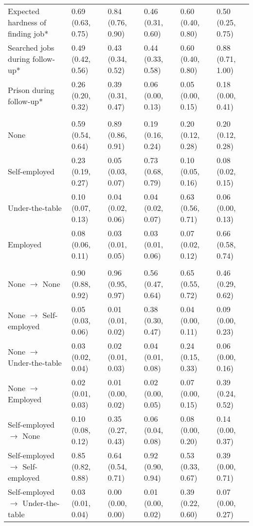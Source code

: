 \begin{table}[htp]
\begin{threeparttable}
\begin{tabular}{llllll}
  \quad Expected hardness of finding job* & 0.69 (0.63, 0.75) & 0.84 (0.76, 0.90) & 0.46 (0.31, 0.60) & 0.60 (0.40, 0.80) & 0.50 (0.25, 0.75) \\ 
  \quad Searched jobs during follow-up* & 0.49 (0.42, 0.56) & 0.43 (0.34, 0.52) & 0.44 (0.33, 0.58) & 0.60 (0.40, 0.80) & 0.88 (0.71, 1.00) \\ 
  \quad Prison during follow-up* & 0.26 (0.20, 0.32) & 0.39 (0.31, 0.47) & 0.06 (0.00, 0.13) & 0.05 (0.00, 0.15) & 0.18 (0.00, 0.41) \\ 
  \addlinespace[12pt]
\multicolumn{6}{l}{\textbf{Time spent in states (proportion)}} \\
\addlinespace
\quad None & 0.59 (0.54, 0.64) & 0.89 (0.86, 0.91) & 0.19 (0.16, 0.24) & 0.20 (0.12, 0.28) & 0.20 (0.12, 0.28) \\ 
  \quad Self-employed & 0.23 (0.19, 0.27) & 0.05 (0.03, 0.07) & 0.73 (0.68, 0.79) & 0.10 (0.05, 0.16) & 0.08 (0.02, 0.15) \\ 
  \quad Under-the-table & 0.10 (0.07, 0.13) & 0.04 (0.02, 0.06) & 0.04 (0.02, 0.07) & 0.63 (0.56, 0.71) & 0.06 (0.00, 0.13) \\ 
  \quad Employed & 0.08 (0.06, 0.11) & 0.03 (0.01, 0.05) & 0.03 (0.01, 0.06) & 0.07 (0.02, 0.12) & 0.66 (0.58, 0.74) \\ 
  \addlinespace[12pt]
\multicolumn{6}{l}{\textbf{Transition rates}} \\
\quad None $\rightarrow$ None & 0.90 (0.88, 0.92) & 0.96 (0.95, 0.97) & 0.56 (0.47, 0.64) & 0.65 (0.55, 0.72) & 0.46 (0.29, 0.62) \\ 
  \quad None $\rightarrow$ Self-employed & 0.05 (0.03, 0.06) & 0.01 (0.01, 0.02) & 0.38 (0.30, 0.47) & 0.04 (0.00, 0.11) & 0.09 (0.00, 0.23) \\ 
  \quad None $\rightarrow$ Under-the-table & 0.03 (0.02, 0.04) & 0.02 (0.01, 0.03) & 0.04 (0.01, 0.08) & 0.24 (0.15, 0.33) & 0.06 (0.00, 0.16) \\ 
  \quad None $\rightarrow$ Employed & 0.02 (0.01, 0.03) & 0.01 (0.00, 0.02) & 0.02 (0.00, 0.05) & 0.07 (0.00, 0.15) & 0.39 (0.24, 0.52) \\ 
   \addlinespace[12pt] 
\quad Self-employed $\rightarrow$ None & 0.10 (0.08, 0.12) & 0.35 (0.27, 0.43) & 0.06 (0.04, 0.08) & 0.08 (0.00, 0.20) & 0.14 (0.00, 0.37) \\ 
  \quad Self-employed $\rightarrow$ Self-employed & 0.85 (0.82, 0.88) & 0.64 (0.54, 0.71) & 0.92 (0.90, 0.94) & 0.53 (0.33, 0.67) & 0.39 (0.00, 0.71) \\ 
  \quad Self-employed $\rightarrow$ Under-the-table & 0.03 (0.01, 0.04) & 0.00 (0.00, 0.00) & 0.01 (0.00, 0.02) & 0.39 (0.22, 0.60) & 0.07 (0.00, 0.27) \\ 

\end{tabular}
\end{threeparttable}
\end{table}
